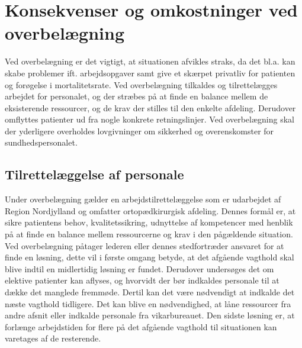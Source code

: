 






\section{Konsekvenser og omkostninger ved overbelægning}
Ved overbelægning er det vigtigt, at situationen afvikles straks, da det bl.a. kan skabe problemer ift. arbejdsopgaver samt give et skærpet privatliv for patienten og forøgelse i mortalitetsrate. \cite{Madsen2014}
Ved overbelægning tilkaldes og tilrettelægges arbejdet for personalet, og der stræbes på at finde en balance mellem de eksisterende ressourcer, og de krav der stilles til den enkelte afdeling. \cite{Bjerg2016} Derudover omflyttes  patienter ud fra nogle konkrete retningslinjer. \cite{Beredskab2016} Ved overbelægning skal der yderligere overholdes lovgivninger om sikkerhed og overenskomster for sundhedspersonalet. \cite{Beredskab2016}


\subsection{Tilrettelæggelse af personale}
Under overbelægning gælder en arbejdstilrettelæggelse som er udarbejdet af Region Nordjylland og omfatter ortopædkirurgisk afdeling. Dennes formål er, at sikre patientens behov, kvalitetssikring, udnyttelse af kompetencer med henblik på at finde en balance mellem ressourcerne og krav i den pågældende situation. Ved overbelægning påtager lederen eller dennes stedfortræder ansvaret for at finde en løsning, dette vil i første omgang betyde, at det afgående vagthold skal blive indtil en midlertidig løsning er fundet. Derudover undersøges det om elektive patienter kan aflyses, og hvorvidt der bør indkaldes personale til at dække det manglede fremmøde. Dertil kan det være nødvendigt at indkalde det næste vagthold tidligere. Det kan blive en nødvendighed, at låne ressourcer fra andre afsnit eller indkalde personale fra vikarbureauet. Den sidste løsning er, at forlænge arbejdstiden for flere på det afgående vagthold til situationen kan varetages af de resterende. \cite{Bjerg2016}

